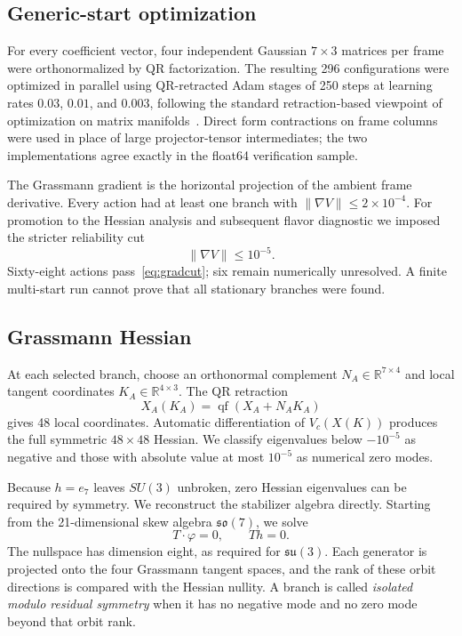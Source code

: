 \documentclass[11pt]{article}
\newcommand{\RR}{\mathbb R}
\begin{document}
\subsection{Generic-start optimization}

For every coefficient vector, four independent Gaussian $7\times3$ matrices per frame were orthonormalized by QR factorization.  The resulting 296 configurations were optimized in parallel using QR-retracted Adam stages of 250 steps at learning rates $0.03$, $0.01$, and $0.003$, following the standard retraction-based viewpoint of optimization on matrix manifolds~\cite{AbsilMahonySepulchre2008}.  Direct form contractions on frame columns were used in place of large projector-tensor intermediates; the two implementations agree exactly in the float64 verification sample.

The Grassmann gradient is the horizontal projection of the ambient frame derivative.  Every action had at least one branch with $\lVert\nabla V\rVert\le2\times10^{-4}$.  For promotion to the Hessian analysis and subsequent flavor diagnostic we imposed the stricter reliability cut
\begin{equation}
  \lVert\nabla V\rVert\le10^{-5}.
  \label{eq:gradcut}
\end{equation}
Sixty-eight actions pass~\eqref{eq:gradcut}; six remain numerically unresolved.  A finite multi-start run cannot prove that all stationary branches were found.

\subsection{Grassmann Hessian}

At each selected branch, choose an orthonormal complement $N_A\in\RR^{7\times4}$ and local tangent coordinates $K_A\in\RR^{4\times3}$.  The QR retraction
\begin{equation}
  X_A(K_A)=\operatorname{qf}(X_A+N_AK_A)
\end{equation}
gives 48 local coordinates.  Automatic differentiation of $V_c(X(K))$ produces the full symmetric $48\times48$ Hessian.  We classify eigenvalues below $-10^{-5}$ as negative and those with absolute value at most $10^{-5}$ as numerical zero modes.

Because $h=e_7$ leaves $SU(3)$ unbroken, zero Hessian eigenvalues can be required by symmetry.  We reconstruct the stabilizer algebra directly.  Starting from the 21-dimensional skew algebra $\mathfrak{so}(7)$, we solve
\begin{equation}
  T\cdot\varphi=0,\qquad Th=0.
\end{equation}
The nullspace has dimension eight, as required for $\mathfrak{su}(3)$.  Each generator is projected onto the four Grassmann tangent spaces, and the rank of these orbit directions is compared with the Hessian nullity.  A branch is called \emph{isolated modulo residual symmetry} when it has no negative mode and no zero mode beyond that orbit rank.
\end{document}
